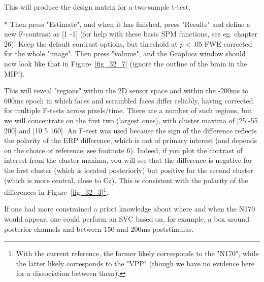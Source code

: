 This will produce the design matrix for a two-sample t-test.

* Then press "Estimate", and when it has finished, press "Results" and define a new F-contrast as [1 -1] (for help with these basic SPM functions, see eg. chapter 26). Keep the default contrast options, but threshold at $p<.05$ FWE corrected for the whole "image". Then press "volume", and the Graphics window should now look like that in Figure~\ref{fig_32_7} (ignore the outline of the brain in the MIP!).

This will reveal "regions" within the 2D sensor space and within the -200ms to 600ms epoch in which faces and scrambled faces differ reliably, having corrected for multiple F-tests across pixels/time. There are a number of such regions, but we will concentrate on the first two (largest ones), with cluster maxima of  [25 -55 200] and [10 5 160]. An F-test was used because the sign of the difference reflects the polarity of the ERP difference, which is not of primary interest (and depends on the choice of reference; see footnote 6). Indeed, if you plot the contrast of interest from the cluster maxima, you will see that the difference is negative for the first cluster (which is located posteriorly) but positive for the second cluster (which is more central, close to Cz). This is consistent with the polarity of the differences in Figure~\ref{fig_32_3}\footnote{With the current reference, the former likely corresponds to the "N170", while the latter likely corresponds to the "VPP" (though we have no evidence here for a dissociation between them).}.

If one had more constrained a priori knowledge about where and when the N170 would appear, one could perform an SVC based on, for example, a box around posterior channels and between 150 and 200ms poststimulus.

